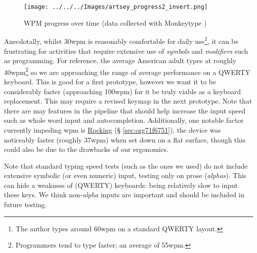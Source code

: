 \documentclass[logo,bsc,singlespacing,parskip]{infthesis}
\begin{document}
\begin{figure}[h]
\centering
\texttt{[image: ../../../Images/artsey\_progress2\_invert.png]}
\caption[WPM progress over time]{\label{fig:wpm}WPM progress over time (data collected with Monkeytype \autocite{miodecMonkeytype})}
\end{figure}

Anecdotally, whilst 30wpm is reasonably comfortable for daily use\footnote{The author types around 60wpm on a standard QWERTY layout.}, it can be frustrating for activities that require extensive use of \emph{symbols} and \emph{modifiers} such as programming.
For reference, the average American adult types at roughly 40wpm\footnote{Programmers tend to type faster; an average of 55wpm.} \autocite{WhatAverageTyping} so we are approaching the range of average performance on a QWERTY keyboard.
This is good for a first prototype, however we want it to be considerably faster (approaching 100wpm) for it be truly viable as a keyboard replacement.
This may require a revised keymap in the next prototype.
Note that there are may features in the pipeline that should help increase the input speed such as whole word input and autocompletion.
Additionally, one notable factor currently impeding wpm is
\hyperref[sec:org71f6751]{Rocking} (§ \ref{sec:org71f6751}),  the device was noticeably faster (roughly 37wpm) when set down on a flat surface, though this could also be due to the drawbacks of our ergonomics. \medskip

Note that standard typing speed tests (such as the ones we used) do not include extensive symbolic (or even numeric) input, testing only on prose (\emph{alphas}). This can hide a weakness of (QWERTY) keyboards: being relatively slow to input these keys. We think non-\emph{alpha} inputs are important and should be included in future testing.
\end{document}
